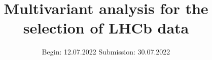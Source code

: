 


\title{Multivariant analysis for the selection of LHCb data}
\date{%
  Begin: 12.07.2022
  \hspace{3em}
  Submission:  30.07.2022
}



\maketitle
\thispagestyle{empty}
\tableofcontents
\newpage






\printbibliography{}


